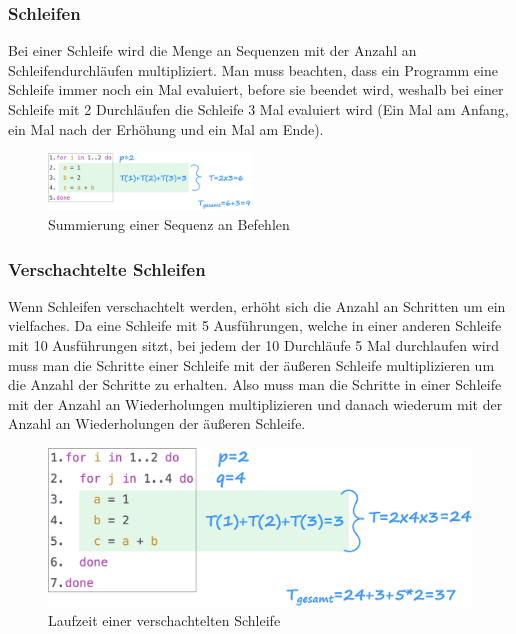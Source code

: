 \documentclass{article}
\begin{document}
	\subsubsection{Schleifen}
	Bei einer Schleife wird die Menge an Sequenzen mit der Anzahl an Schleifendurchläufen multipliziert. Man muss beachten, dass ein Programm eine Schleife immer noch ein Mal evaluiert, before sie beendet wird, weshalb bei einer Schleife mit 2 Durchläufen die Schleife 3 Mal evaluiert wird (Ein Mal am Anfang, ein Mal nach der Erhöhung und ein Mal am Ende).
	\begin{figure}[H]
	\centering
	\includegraphics[width=0.48\textwidth]{Bilder/loop.png}
	\caption{Summierung einer Sequenz an Befehlen}
	\end{figure}
	\subsubsection{Verschachtelte Schleifen}
	Wenn Schleifen verschachtelt werden, erhöht sich die Anzahl an Schritten um ein vielfaches. Da eine Schleife mit 5 Ausführungen, welche in einer anderen Schleife mit 10 Ausführungen sitzt, bei jedem der 10 Durchläufe 5 Mal durchlaufen wird muss man die Schritte einer Schleife mit der äußeren Schleife multiplizieren um die Anzahl der Schritte zu erhalten. Also muss man die Schritte in einer Schleife mit der Anzahl an Wiederholungen multiplizieren und danach wiederum mit der Anzahl an Wiederholungen der äußeren Schleife.
	\begin{figure}[H]
	\centering
	\includegraphics[scale=0.20]{Bilder/nested.png}
	\caption{Laufzeit einer verschachtelten Schleife}
	\end{figure}
\end{document}
